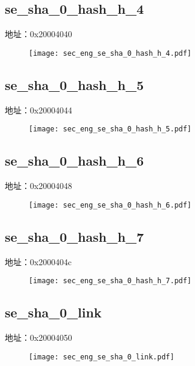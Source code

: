 \subsection{se\_sha\_0\_hash\_h\_4}
\label{sec_eng-se-sha-0-hash-h-4}
地址：0x20004040
 \begin{figure}[H]
\texttt{[image: sec\_eng\_se\_sha\_0\_hash\_h\_4.pdf]}
\end{figure}

\subsection{se\_sha\_0\_hash\_h\_5}
\label{sec_eng-se-sha-0-hash-h-5}
地址：0x20004044
 \begin{figure}[H]
\texttt{[image: sec\_eng\_se\_sha\_0\_hash\_h\_5.pdf]}
\end{figure}

\subsection{se\_sha\_0\_hash\_h\_6}
\label{sec_eng-se-sha-0-hash-h-6}
地址：0x20004048
 \begin{figure}[H]
\texttt{[image: sec\_eng\_se\_sha\_0\_hash\_h\_6.pdf]}
\end{figure}

\subsection{se\_sha\_0\_hash\_h\_7}
\label{sec_eng-se-sha-0-hash-h-7}
地址：0x2000404c
 \begin{figure}[H]
\texttt{[image: sec\_eng\_se\_sha\_0\_hash\_h\_7.pdf]}
\end{figure}

\subsection{se\_sha\_0\_link}
\label{sec_eng-se-sha-0-link}
地址：0x20004050
 \begin{figure}[H]
\texttt{[image: sec\_eng\_se\_sha\_0\_link.pdf]}
\end{figure}

